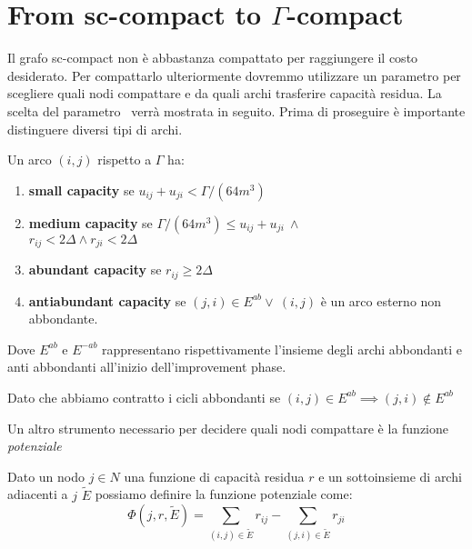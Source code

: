 \section{From sc-compact to $\Gamma$-compact}
Il grafo sc-compact non è abbastanza compattato per raggiungere il costo desiderato. Per compattarlo ulteriormente dovremmo utilizzare un parametro \gmm per scegliere quali nodi compattare e da quali archi trasferire capacità residua.
La scelta del parametro \gmm\ verrà mostrata in seguito.
Prima di proseguire è importante distinguere diversi tipi di archi.
\begin{definition}
    Un arco $(i,j)$ rispetto a $\Gamma$ ha:
    \begin{enumerate}
        \item \textbf{small capacity} se $u_{ij}+u_{ji} < \Gamma/(64m^3)$
        \item \label{media}\textbf{medium capacity} se $\Gamma/(64m^3) \le u_{ij}+u_{ji}\ \land$\\ $r_{ij} < 2\Delta \land r_{ji} < 2\Delta $
        \item \textbf{abundant capacity} se $r_{ij} \ge 2\Delta$ 
        \item \textbf{antiabundant capacity} se $(j,i) \in E^{ab} \lor\ (i,j)$ è un arco esterno non abbondante.
    \end{enumerate}
    Dove $E^{ab}$ e $E^{-ab}$ rappresentano rispettivamente l'insieme degli archi abbondanti e anti abbondanti all'inizio dell'improvement phase.

   
    
\end{definition}
\begin{obs}
    Dato che abbiamo contratto i cicli abbondanti se $(i,j)\in E^{ab}\implies (j,i)\not \in E^{ab}$
\end{obs}


Un altro strumento necessario per decidere quali nodi compattare è la funzione \textit{potenziale}
\begin{definition}

    Dato un nodo $j\in N$ una funzione di capacità residua $r$ e un sottoinsieme di archi adiacenti a $j$ $\tilde{E}$  possiamo definire la funzione potenziale come: 
    \[\Phi (j, r, \tilde{E}) = \sum_{(i,j)\in \tilde{E}} r_{ij}-\sum_{(j,i)\in \tilde{E}} r_{ji}\] 
\end{definition}

